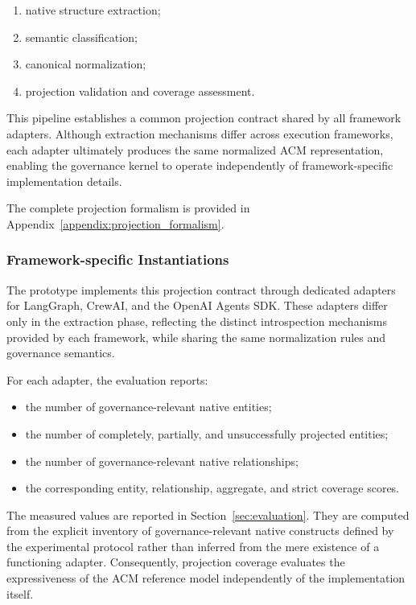 \documentclass[10pt]{article}
\begin{document}
\begin{enumerate}
	\item native structure extraction;
	\item semantic classification;
	\item canonical normalization;
	\item projection validation and coverage assessment.
\end{enumerate}

This pipeline establishes a common projection contract shared by all framework adapters. Although extraction mechanisms differ across execution frameworks, each adapter ultimately produces the same normalized ACM representation, enabling the governance kernel to operate independently of framework-specific implementation details.

The complete projection formalism is provided in Appendix~\ref{appendix:projection_formalism}.

\subsubsection{Framework-specific Instantiations}

The prototype implements this projection contract through dedicated adapters for LangGraph, CrewAI, and the OpenAI Agents SDK. These adapters differ only in the extraction phase, reflecting the distinct introspection mechanisms provided by each framework, while sharing the same normalization rules and governance semantics.

For each adapter, the evaluation reports:

\begin{itemize}
	\item the number of governance-relevant native entities;
	\item the number of completely, partially, and unsuccessfully projected entities;
	\item the number of governance-relevant native relationships;
	\item the corresponding entity, relationship, aggregate, and strict coverage scores.
\end{itemize}

The measured values are reported in Section~\ref{sec:evaluation}. They are computed from the explicit inventory of governance-relevant native constructs defined by the experimental protocol rather than inferred from the mere existence of a functioning adapter. Consequently, projection coverage evaluates the expressiveness of the ACM reference model independently of the implementation itself.
\end{document}
